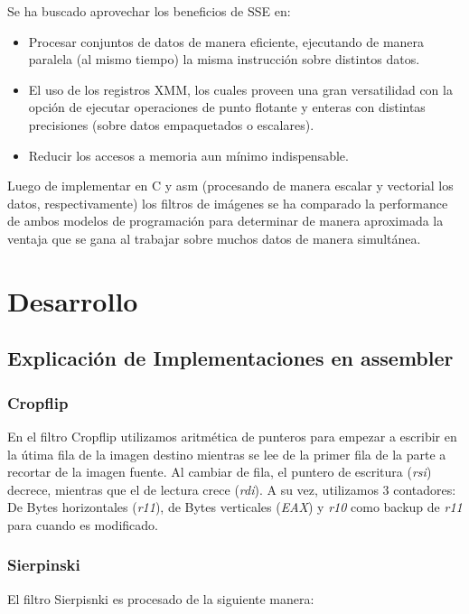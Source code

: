 \documentclass[a4paper]{article}
\begin{document}
Se ha buscado aprovechar los beneficios de SSE en: 

\begin{itemize}

	\item Procesar conjuntos de datos de manera eficiente, ejecutando de manera paralela (al mismo tiempo) la misma instrucci\'{o}n sobre distintos datos.
	
	\item El uso de los registros XMM, los cuales proveen una gran versatilidad con la opci\'{o}n de ejecutar operaciones de punto flotante y enteras con distintas precisiones (sobre datos empaquetados o escalares).

	\item Reducir los accesos a memoria aun m\'{i}nimo indispensable.

\end{itemize} 
Luego de implementar en C y asm (procesando de manera escalar y vectorial los datos, respectivamente) los filtros de im\'{a}genes se ha comparado la performance de ambos modelos de programaci\'{o}n para determinar de manera aproximada la ventaja que se gana al trabajar sobre muchos datos de manera simult\'{a}nea.

\newpage

\section{Desarrollo}

\subsection{Explicaci\'{o}n de Implementaciones en assembler}

\subsubsection{Cropflip}
En el filtro Cropflip utilizamos aritm\'{e}tica de punteros para empezar a escribir en la \'{u}tima fila de la imagen destino mientras se lee de la primer fila de la parte a recortar de la imagen fuente. Al cambiar de fila, el puntero de escritura (\textit{rsi}) decrece, mientras que el de lectura crece (\textit{rdi}). A su vez, utilizamos 3 contadores: De Bytes horizontales (\textit{r11}), de Bytes verticales (\textit{EAX}) y \textit{r10} como backup de \textit{r11} para cuando es modificado. 

\subsubsection{Sierpinski}
El filtro Sierpisnki es procesado de la siguiente manera:
\end{document}
